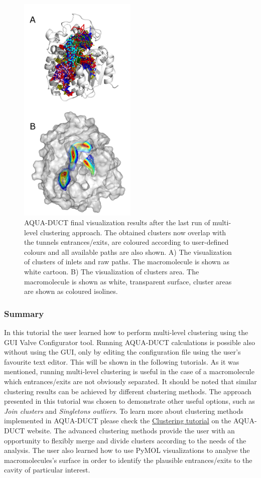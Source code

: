 \documentclass[9pt,tutorial]{livecoms}
\begin{document}
\begin{figure}[ht!]
\centering
\includegraphics[width=0.5\textwidth]{Tut2.4.png}
\caption{AQUA-DUCT final visualization results after the last run of multi-level clustering approach. The obtained clusters now overlap with the tunnels entrances/exits, are coloured according to user-defined colours and all available paths are also shown. A) The visualization of clusters of inlets and raw paths. The macromolecule is shown as white cartoon. B) The visualization of clusters area. The macromolecule is shown as white, transparent surface, cluster areas are shown as coloured isolines.}
\label{Tut2.4}
\end{figure}

\subsubsection{Summary}
In this tutorial the user learned how to perform multi-level clustering using the GUI Valve Configurator tool. Running AQUA-DUCT calculations is possible also without using the GUI, only by editing the configuration file using the user's favourite text editor. This will be shown in the following tutorials. As it was mentioned, running multi-level clustering is useful in the case of a macromolecule which entrances/exits are not obviously separated. It should be noted that similar clustering results can be achieved by different clustering methods. The approach presented in this tutorial was chosen to demonstrate other useful options, such as \textit{Join clusters} and \textit{Singletons outliers}. To learn more about clustering methods implemented in AQUA-DUCT please check the \href{http://www.aquaduct.pl/clustering/}{Clustering tutorial} on the AQUA-DUCT website. The advanced clustering methods provide the user with an opportunity to flexibly merge and divide clusters according to the needs of the analysis. The user also learned how to use PyMOL visualizations to analyse the macromolecules's surface in order to identify the plausible entrances/exits to the cavity of particular interest.
\end{document}

